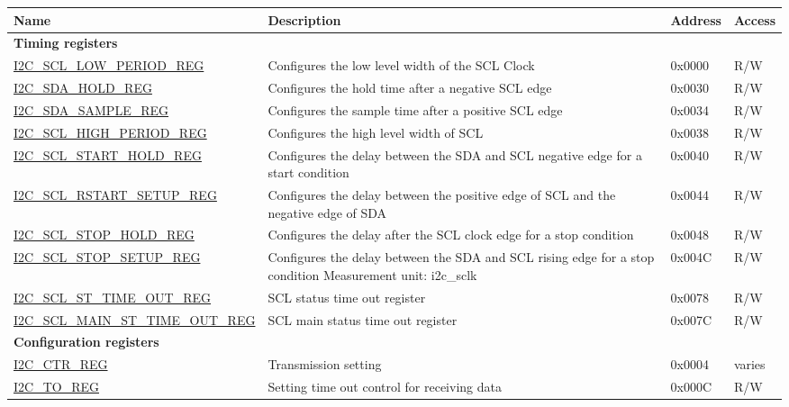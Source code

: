 \begin{longtable}{ | p{6cm} | p{7cm} | p{1.3cm} | p{1cm} | }
    \hline\rowcolor{lightgray}
    Name & Description &  Address & Access \\ \hline
    \endhead
    \multicolumn{4}{|l|}{\textbf{Timing registers}} \\ \hline
    \hyperref[regdesc:I2CSCLLOWPERIODREG]{I2C\_SCL\_LOW\_PERIOD\_REG} & Configures the low level width of the SCL Clock & 0x0000 & R/W \\ \hline
    \hyperref[regdesc:I2CSDAHOLDREG]{I2C\_SDA\_HOLD\_REG} & Configures the hold time after a negative SCL edge & 0x0030 & R/W \\ \hline
    \hyperref[regdesc:I2CSDASAMPLEREG]{I2C\_SDA\_SAMPLE\_REG} & Configures the sample time after a positive SCL edge & 0x0034 & R/W \\ \hline
    \hyperref[regdesc:I2CSCLHIGHPERIODREG]{I2C\_SCL\_HIGH\_PERIOD\_REG} & Configures the high level width of SCL & 0x0038 & R/W \\ \hline
    \hyperref[regdesc:I2CSCLSTARTHOLDREG]{I2C\_SCL\_START\_HOLD\_REG} & Configures the delay between the SDA and SCL negative edge for a start condition & 0x0040 & R/W \\ \hline
    \hyperref[regdesc:I2CSCLRSTARTSETUPREG]{I2C\_SCL\_RSTART\_SETUP\_REG} & Configures the delay between the positive edge of SCL and the negative edge of SDA & 0x0044 & R/W \\ \hline
    \hyperref[regdesc:I2CSCLSTOPHOLDREG]{I2C\_SCL\_STOP\_HOLD\_REG} & Configures the delay after the SCL clock edge for a stop condition & 0x0048 & R/W \\ \hline
    \hyperref[regdesc:I2CSCLSTOPSETUPREG]{I2C\_SCL\_STOP\_SETUP\_REG} & Configures the delay between the SDA and SCL rising edge for a stop condition
    Measurement unit: i2c\_sclk & 0x004C & R/W \\ \hline
    \hyperref[regdesc:I2CSCLSTTIMEOUTREG]{I2C\_SCL\_ST\_TIME\_OUT\_REG} & SCL status time out register & 0x0078 & R/W \\ \hline
    \hyperref[regdesc:I2CSCLMAINSTTIMEOUTREG]{I2C\_SCL\_MAIN\_ST\_TIME\_OUT\_REG} & SCL main status time out register & 0x007C & R/W \\ \hline
    \multicolumn{4}{|l|}{\textbf{Configuration registers}} \\ \hline
    \hyperref[regdesc:I2CCTRREG]{I2C\_CTR\_REG} & Transmission setting & 0x0004 & varies \\ \hline
    \hyperref[regdesc:I2CTOREG]{I2C\_TO\_REG} & Setting time out control for receiving data & 0x000C & R/W \\ \hline

\end{longtable}
